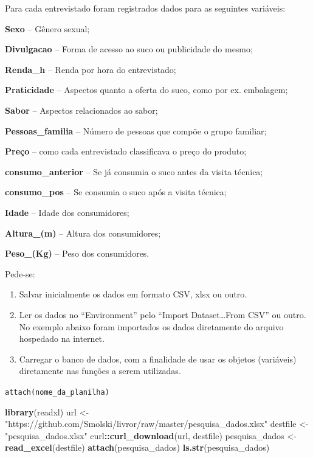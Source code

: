 \documentclass[12pt,portuguese,oneside]{book}
\newenvironment{Shaded}{\begin{snugshade}}{\end{snugshade}}
\newcommand{\KeywordTok}[1]{\textcolor[rgb]{0.13,0.29,0.53}{\textbf{#1}}}
\newcommand{\StringTok}[1]{\textcolor[rgb]{0.31,0.60,0.02}{#1}}
\newcommand{\OperatorTok}[1]{\textcolor[rgb]{0.81,0.36,0.00}{\textbf{#1}}}
\newcommand{\NormalTok}[1]{#1}
\begin{document}
Para cada entrevistado foram registrados dados para as seguintes
variáveis:

\textbf{Sexo} -- Gênero sexual;

\textbf{Divulgacao} -- Forma de acesso ao suco ou publicidade do mesmo;

\textbf{Renda\_h} -- Renda por hora do entrevistado;

\textbf{Praticidade} -- Aspectos quanto a oferta do suco, como por ex.
embalagem;

\textbf{Sabor} -- Aspectos relacionados ao sabor;

\textbf{Pessoas\_familia} -- Número de pessoas que compõe o grupo
familiar;

\textbf{Preço} -- como cada entrevistado classificava o preço do
produto;

\textbf{consumo\_anterior} -- Se já consumia o suco antes da visita
técnica;

\textbf{consumo\_pos} -- Se consumia o suco após a visita técnica;

\textbf{Idade} -- Idade dos consumidores;

\textbf{Altura\_(m)} -- Altura dos consumidores;

\textbf{Peso\_(Kg)} -- Peso dos consumidores.

Pede-se:

\begin{enumerate}
\def\labelenumi{\arabic{enumi}.}
\item
  Salvar inicialmente os dados em formato CSV, xlsx ou outro.
\item
  Ler os dados no ``Environment'' pelo ``Import Dataset\ldots{}From
  CSV'' ou outro. No exemplo abaixo foram importados os dados
  diretamente do arquivo hospedado na internet.
\item
  Carregar o banco de dados, com a finalidade de usar os objetos
  (variáveis) diretamente nas funções a serem utilizadas.
\end{enumerate}

\texttt{attach(nome\_da\_planilha)}

\begin{Shaded}
\begin{Highlighting}[]
\KeywordTok{library}\NormalTok{(readxl)}
\NormalTok{url <-}\StringTok{ "https://github.com/Smolski/livror/raw/master/pesquisa_dados.xlsx"}
\NormalTok{destfile <-}\StringTok{ "pesquisa_dados.xlsx"}
\NormalTok{curl}\OperatorTok{::}\KeywordTok{curl_download}\NormalTok{(url, destfile)}
\NormalTok{pesquisa_dados <-}\StringTok{ }\KeywordTok{read_excel}\NormalTok{(destfile)}
\KeywordTok{attach}\NormalTok{(pesquisa_dados)}
\KeywordTok{ls.str}\NormalTok{(pesquisa_dados)}
\end{Highlighting}
\end{Shaded}
\end{document}
